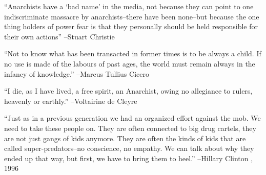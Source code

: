 \documentclass{article}%
\begin{document}
\linebreak%
\vspace{1mm}%
\begin{minipage}{\textwidth}%
\flushleft%
“Anarchists have a ‘bad name’ in the media, not because they can point to one indiscriminate massacre by anarchists–there have been none–but because the one thing holders of power fear is that they personally should be held responsible for their own actions”%
\linebreak%
\vspace{1mm}%
–Stuart Christie%
\linebreak%
\vspace{1mm}%
\end{minipage}%
\linebreak%
\vspace{1mm}%
\begin{minipage}{\textwidth}%
\flushleft%
“Not to know what has been transacted in former times is to be always a child. If no use is made of the labours of past ages, the world must remain always in the infancy of knowledge.”%
\linebreak%
\vspace{1mm}%
–Marcus Tullius Cicero%
\linebreak%
\vspace{1mm}%
\end{minipage}%
\linebreak%
\vspace{1mm}%
\begin{minipage}{\textwidth}%
\flushleft%
“I die, as I have lived, a free spirit, an Anarchist, owing no allegiance to rulers, heavenly or earthly.”%
\linebreak%
\vspace{1mm}%
–Voltairine de Cleyre%
\linebreak%
\vspace{1mm}%
\end{minipage}%
\linebreak%
\vspace{1mm}%
\begin{minipage}{\textwidth}%
\flushleft%
“Just as in a previous generation we had an organized effort against the mob. We need to take these people on. They are often connected to big drug cartels, they are not just gangs of kids anymore. They are often the kinds of kids that are called super{-}predators–no conscience, no empathy. We can talk about why they ended up that way, but first, we have to bring them to heel.”%
\linebreak%
\vspace{1mm}%
–Hillary Clinton%
, 1996%
\linebreak%
\vspace{1mm}%
\end{minipage}%
\end{document}
